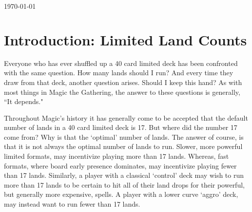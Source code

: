 \documentclass[oneside]{book}   %
\begin{document}
\begin{titlepage}
	\vfill\vfill\vfill %
	
	{\large\today} %
	
	
	 
	
	\vfill %
	
\end{titlepage}

\tableofcontents
 
\listoffigures

\listoftables
 
\mainmatter
 
\chapter{Introduction: Limited Land Counts}
\label{intro}

Everyone who has ever shuffled up a 40 card limited deck has been confronted with the same question. How many lands should I run? And every time they draw from that deck, another question arises. Should I keep this hand? As with most things in Magic the Gathering, the answer to these questions is generally, ``It depends."

Throughout Magic's history it has generally come to be accepted that the default number of lands in a 40 card limited deck is 17. But where did the number 17 come from? Why is that the `optimal' number of lands. The answer of course, is that it is not always the optimal number of lands to run. Slower, more powerful limited formats, may incentivize playing more than 17 lands. Whereas, fast formats, where board early presence dominates, may incentivize playing fewer than 17 lands. Similarly, a player with a classical `control' deck may wish to run more than 17 lands to be certain to hit all of their land drops for their powerful, but generally more expensive, spells. A player with a lower curve `aggro' deck, may instead want to run fewer than 17 lands. 
\end{document}
